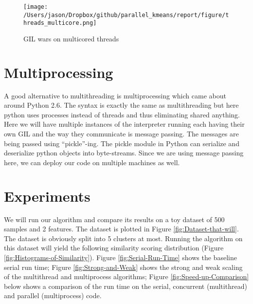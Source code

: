 \documentclass[a0paper,smallertitle]{HYposter}
\begin{document}
\begin{figure}[H] 
\texttt{[image: /Users/jason/Dropbox/github/parallel\_kmeans/report/figure/threads\_multicore.png]}
\caption{GIL wars on multicored threads}
\label{fig:GIL-wars-on}
\end{figure}


\section*{Multiprocessing}

A good alternative to multithreading is multiprocessing which came
about around Python 2.6. The syntax is exactly the same as multithreading
but here python uses processes instead of threads and thus eliminating
shared anything. Here we will have multiple instances of the interpreter
running each having their own GIL and the way they communicate is
message passing. The messages are being passed using ``pickle''-ing.
The pickle module in Python can serialize and deserialize python objects
into byte-streams. Since we are using message passing here, we can
deploy our code on multiple machines as well. 

\section*{Experiments} \label{implementation}

We will run our algorithm and compare its results on a toy dataset
of 500 samples and 2 features. The dataset is plotted in Figure \ref{fig:Dataset-that-will}. The dataset is obviously split into 5 clusters at most. Running the
algorithm on this dataset will yield the following similarity scoring
distribution (Figure \ref{fig:Histograms-of-Similarity}). Figure \ref{fig:Serial-Run-Time} shows the baseline serial run time; Figure \ref{fig:Strong-and-Weak} shows the strong and weak scaling of the multithread and multiprocess algorithms; Figure \ref{fig:Speed-up-Comparison} below shows a comparison of the run time on the serial, concurrent (multithread) and parallel (multiprocess) code.
\end{document}
